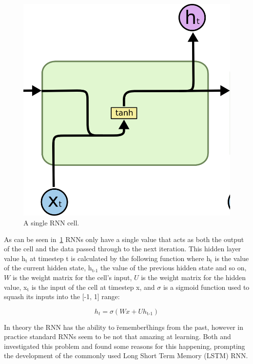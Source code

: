 \begin{figure}
	\begin{center}
		\includegraphics[scale=0.5]{rnn/rnn_cell}
	\end{center}
	\caption{A single RNN cell.\label{fig:rnn_cell}}
\end{figure}

As can be seen in~\ref{fig:rnn_cell} RNNs only have a single value that acts as both the output of the cell and the data passed through to the next iteration. This hidden layer value h$_{\text{t}}$ at timestep t is calculated by the following function where h$_{\text{t}}$ is the value of the current hidden state, h$_{\text{t-1}}$ the value of the previous hidden state and so on, $W$ is the weight matrix for the cell's input, $U$ is the weight matrix for the hidden value, x$_{\text{t}}$ is the input of the cell at timestep x, and $\sigma$ is a sigmoid function used to squash its inputs into the [-1, 1] range:

\[ h_t = \sigma(Wx + Uh_\text{t-1}) \]

In theory the RNN has the ability to \"remember\" things from the past, however in practice standard RNNs seem to be not that amazing at learning. Both \cite{hochreiter1997long} and \cite{bengio1994learning} investigated this problem and found some reasons for this happening, prompting the development of the commonly used Long Short Term Memory (LSTM) RNN.

